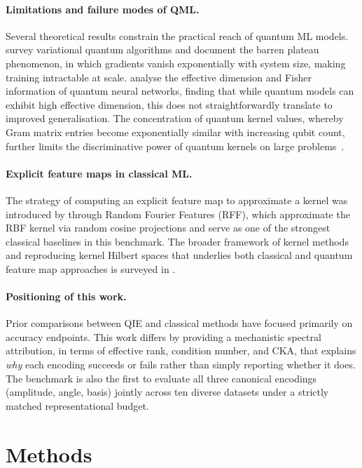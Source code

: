 \documentclass[12pt]{article}
\begin{document}
\paragraph{Limitations and failure modes of QML.}
Several theoretical results constrain the practical reach of quantum ML models.
\citet{cerezo2021} survey variational quantum algorithms and document the
barren plateau phenomenon, in which gradients vanish exponentially with system
size, making training intractable at scale.
\citet{abbas2021} analyse the effective dimension and Fisher information of
quantum neural networks, finding that while quantum models can exhibit high
effective dimension, this does not straightforwardly translate to improved
generalisation.
The concentration of quantum kernel values, whereby Gram matrix entries become
exponentially similar with increasing qubit count, further limits the
discriminative power of quantum kernels on large
problems~\citep{thanasilp2024}.

\paragraph{Explicit feature maps in classical ML.}
The strategy of computing an explicit feature map to approximate a kernel
was introduced by \citet{rahimi2007} through Random Fourier Features (RFF),
which approximate the RBF kernel via random cosine projections and serve as
one of the strongest classical baselines in this benchmark.
The broader framework of kernel methods and reproducing kernel Hilbert spaces
that underlies both classical and quantum feature map approaches is surveyed
in \citet{scholkopf2002}.

\paragraph{Positioning of this work.}
Prior comparisons between QIE and classical methods have focused primarily
on accuracy endpoints.
This work differs by providing a mechanistic spectral attribution, in terms
of effective rank, condition number, and CKA, that explains \emph{why} each
encoding succeeds or fails rather than simply reporting whether it does.
The benchmark is also the first to evaluate all three canonical encodings
(amplitude, angle, basis) jointly across ten diverse datasets under a strictly
matched representational budget.

\section{Methods}
\label{sec:methods}
\end{document}
